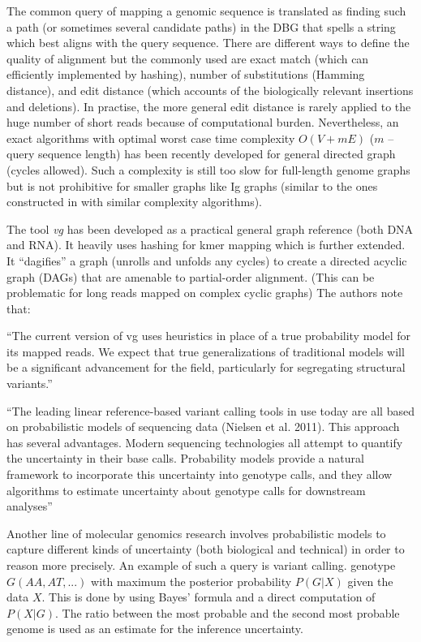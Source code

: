 The common query of mapping a genomic sequence is translated as finding such a path (or sometimes several candidate paths) in the DBG that spells a string which best aligns with the query sequence.
There are different ways to define the quality of alignment but the commonly used are exact match (which can efficiently implemented by hashing),
  number of substitutions (Hamming distance), and edit distance (which accounts of the biologically relevant insertions and deletions).
In practise, the more general edit distance is rarely applied to the huge number of short reads because of computational burden.
Nevertheless, an exact algorithms with optimal worst case time complexity $O(V + mE)$ ($m$ -- query sequence length) has been recently developed for general directed graph (cycles allowed).\cite{rautiainen2017aligning}
Such a complexity is still too slow for full-length genome graphs but is not prohibitive for smaller graphs like Ig graphs
  (similar to the ones constructed in \cite{bonissone2015immunoglobulin} with similar complexity algorithms).

The tool \emph{vg}\cite{VGtool,paten2017genome,garrison2018variation} has been developed as a practical general graph reference (both DNA and RNA).
It heavily uses hashing for kmer mapping which is further extended.
It ``dagifies'' a graph (unrolls and unfolds any cycles) to create a directed acyclic graph (DAGs) that are amenable to partial-order alignment.\cite{paten2017genome}
  (This can be problematic for long reads mapped on complex cyclic graphs) The authors note that:

``The current version of vg uses heuristics in place of a true probability model for its mapped reads.
We expect that true generalizations of traditional models will be a significant advancement for the field, particularly for segregating structural variants.''

``The leading linear reference-based variant calling tools in use today are all based on probabilistic models of sequencing data (Nielsen et al. 2011). This approach has several advantages. Modern sequencing technologies all attempt to quantify the uncertainty in their base calls. Probability models provide a natural framework to incorporate this uncertainty into genotype calls, and they allow algorithms to estimate uncertainty about genotype calls for downstream analyses''


Another line of molecular genomics research involves probabilistic models to capture different kinds of uncertainty (both biological and technical) in order to reason more precisely. An example of such a query is variant calling. genotype $G (AA, AT, ...)$ with maximum the posterior probability $P(G | X)$ given the data $X$. This is done by using Bayes' formula and a direct computation of $P(X | G)$. The ratio between the most probable and the second most probable genome is used as an estimate for the inference uncertainty.\cite{nielsen2011genotype} 

